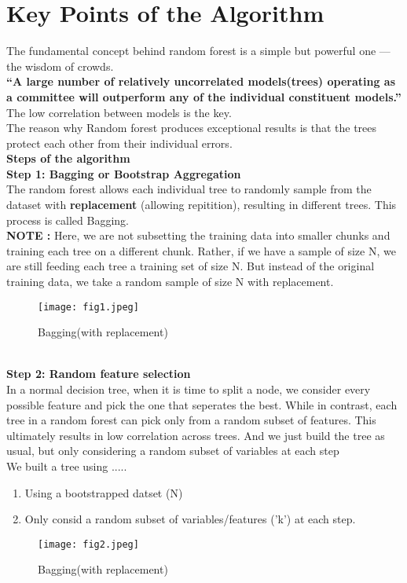 \documentclass[a4paper, 11pt]{article}
\begin{document}
\section{Key Points of the Algorithm}
The fundamental concept behind random forest is a simple but powerful one — the wisdom of crowds.\\
\textbf{“A large number of relatively uncorrelated models(trees) operating as a committee will outperform any of the individual constituent models.”}\\
The low correlation between models is the key.\\
The reason why Random forest produces exceptional results is that the trees protect each other from their individual errors. \\
\textbf{Steps of the algorithm }\\
\textbf{Step 1: Bagging or Bootstrap Aggregation}\\
The random forest allows each 
individual tree to randomly sample from the dataset with \textbf{replacement} (allowing repitition), resulting in different trees. This process is called Bagging.\\
\textbf{NOTE :} Here, we are not subsetting the training data into smaller chunks and training each tree on a different chunk. Rather, if we have a sample of size N, we are still feeding each tree a training set of size N.
 But instead of the original training data, we take a random sample of size N with replacement.
\begin{figure}[ht!]
    \texttt{[image: fig1.jpeg]}
    \caption{Bagging(with replacement)}
    \label{fig:fig1}
  \end{figure}
\vspace{3mm}\\
\textbf{Step 2: Random feature selection}  \\
In a normal decision tree, when it is time to split a node, we consider every possible feature and pick the one that seperates the best.
While in contrast, each tree in a random forest can pick only from a random subset of features. This ultimately results in low correlation across trees. And we just build the tree as usual, but only considering a random subset of variables at each step
\\ We built a tree using .....
\begin{enumerate}
  \item Using a bootstrapped datset (N)
  \item Only consid a random subset of variables/features ('k') at each step.
\end{enumerate}
\pagebreak
\begin{figure}[h!]
  \texttt{[image: fig2.jpeg]}
  \caption{Bagging(with replacement)}
  \label{fig:fig2}
\end{figure}
\end{document}

